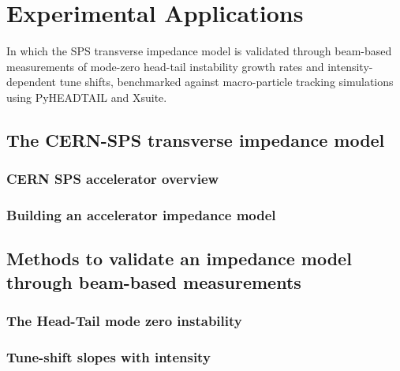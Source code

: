 %
\chapter{Experimental Applications}
\label{ch::chapter6}

\begin{center}
  \begin{minipage}{0.6\textwidth}
    \begin{small}
      In which the SPS transverse impedance model is validated through
      beam-based measurements of mode-zero head-tail instability growth
      rates and intensity-dependent tune shifts, benchmarked against
      macro-particle tracking simulations using PyHEADTAIL and Xsuite.
    \end{small}
  \end{minipage}
  \vspace{0.5cm}
\end{center}

\section{The CERN-SPS transverse impedance model}

\subsection{CERN SPS accelerator overview}

\subsection{Building an accelerator impedance model}

\section{Methods to validate an impedance model through beam-based measurements}

\subsection{The Head-Tail mode zero instability}

\subsection{Tune-shift slopes with intensity}

